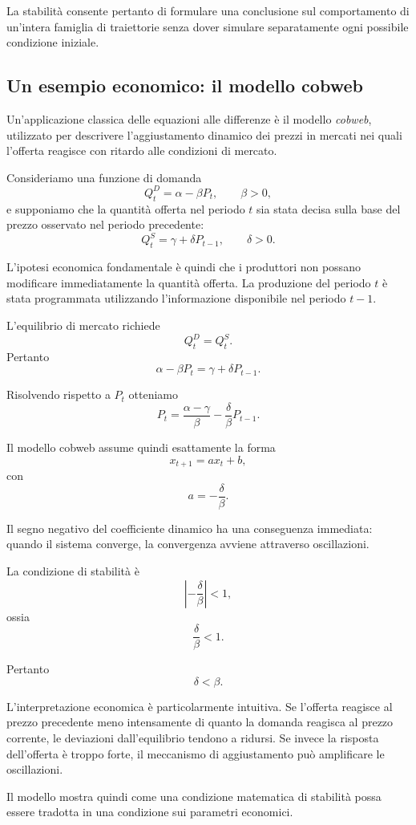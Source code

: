 \documentclass{book}
\begin{document}
La stabilità consente pertanto di formulare una conclusione sul
comportamento di un'intera famiglia di traiettorie senza dover
simulare separatamente ogni possibile condizione iniziale.


\subsection{Un esempio economico: il modello cobweb}

Un'applicazione classica delle equazioni alle differenze è il modello
\emph{cobweb}, utilizzato per descrivere l'aggiustamento dinamico dei
prezzi in mercati nei quali l'offerta reagisce con ritardo alle
condizioni di mercato.

Consideriamo una funzione di domanda
\[
Q_t^D=\alpha-\beta P_t,
\qquad \beta>0,
\]
e supponiamo che la quantità offerta nel periodo $t$ sia stata decisa
sulla base del prezzo osservato nel periodo precedente:
\[
Q_t^S=\gamma+\delta P_{t-1},
\qquad \delta>0.
\]

L'ipotesi economica fondamentale è quindi che i produttori non possano
modificare immediatamente la quantità offerta. La produzione del
periodo $t$ è stata programmata utilizzando l'informazione disponibile
nel periodo $t-1$.

L'equilibrio di mercato richiede
\[
Q_t^D=Q_t^S.
\]
Pertanto
\[
\alpha-\beta P_t
=
\gamma+\delta P_{t-1}.
\]

Risolvendo rispetto a $P_t$ otteniamo
\[
P_t
=
\frac{\alpha-\gamma}{\beta}
-
\frac{\delta}{\beta}P_{t-1}.
\]

Il modello cobweb assume quindi esattamente la forma
\[
x_{t+1}=ax_t+b,
\]
con
\[
a=-\frac{\delta}{\beta}.
\]

Il segno negativo del coefficiente dinamico ha una conseguenza
immediata: quando il sistema converge, la convergenza avviene attraverso
oscillazioni.

La condizione di stabilità è
\[
\left|-\frac{\delta}{\beta}\right|<1,
\]
ossia
\[
\frac{\delta}{\beta}<1.
\]

Pertanto
\[
\delta<\beta.
\]

L'interpretazione economica è particolarmente intuitiva. Se l'offerta
reagisce al prezzo precedente meno intensamente di quanto la domanda
reagisca al prezzo corrente, le deviazioni dall'equilibrio tendono a
ridursi. Se invece la risposta dell'offerta è troppo forte, il
meccanismo di aggiustamento può amplificare le oscillazioni.

Il modello mostra quindi come una condizione matematica di stabilità
possa essere tradotta in una condizione sui parametri economici.
\end{document}
